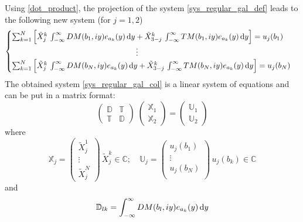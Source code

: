 Using \eqref{dot_product}, the projection of the system \eqref{sys_regular_gal_def} leads to the following new system (for $j=1,2$)
\begin{equation}
\label{sys_regular_gal_col}
\begin{cases}
\sum_{k=1}^N \left[ \tilde{X}_j^k \, \int_{-\infty}^\infty DM(b_1,iy) e_{a_k}(y) \, {\rm d} y + \tilde{X}_{3-j}^k \, \int_{-\infty}^\infty TM(b_1,iy) e_{a_k}(y) \, {\rm d} y \right] = u_j(b_1) \\
 \qquad \qquad \qquad \qquad \qquad \qquad \qquad \qquad \vdots \\
\sum_{k=1}^N \left[ \tilde{X}_j^k \, \int_{-\infty}^\infty DM(b_N,iy) e_{a_k}(y) \, {\rm d} y + \tilde{X}_{3-j}^k \, \int_{-\infty}^\infty TM(b_N,iy) e_{a_k}(y) \, {\rm d} y \right] = u_j(b_N)
\end{cases}
\end{equation}
The obtained system \eqref{sys_regular_gal_col} is a linear system of equations and can be put in a matrix format:
\begin{equation}
\label{Syst_lineaire}
\begin{pmatrix}
\mathbb{D} & \mathbb{T}\\
\mathbb{T} & \mathbb{D}
\end{pmatrix}
\;
\begin{pmatrix}
\mathbb{X}_1\\
\mathbb{X}_2
\end{pmatrix}
 = 
\begin{pmatrix}
\mathbb{U}_1\\
\mathbb{U}_2
\end{pmatrix}
\end{equation}
where
\begin{equation}
\mathbb{X}_j = 
\begin{pmatrix}
\tilde{X}_j^1 \\
\vdots \\
\tilde{X}_j^N
\end{pmatrix}
\, \tilde{X}_j^k \in \mathbb{C}; \quad
\mathbb{U}_j = 
\begin{pmatrix}
u_j(b_1)\\
\vdots\\
u_j(b_N)\\
\end{pmatrix}
\, u_j(b_k) \in \mathbb{C}
\end{equation} 
and 
\begin{equation}
\label{D_matrix}
\mathbb{D}_{lk} = \int_{-\infty}^\infty DM(b_l,iy) e_{a_k}(y) \, {\rm d} y
\end{equation}
